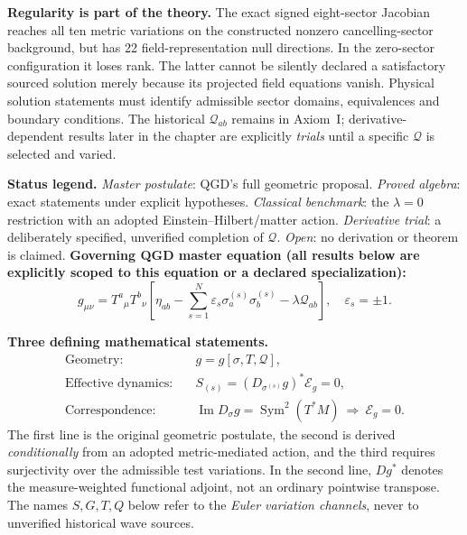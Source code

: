 \documentclass[11pt,a4paper]{article}
\begin{document}
\noindent\textbf{Regularity is part of the theory.} The exact signed eight-sector Jacobian reaches all ten metric variations on the constructed nonzero cancelling-sector background, but has 22 field-representation null directions. In the zero-sector configuration it loses rank. The latter cannot be silently declared a satisfactory sourced solution merely because its projected field equations vanish. Physical solution statements must identify admissible sector domains, equivalences and boundary conditions. The historical $\mathcal Q_{ab}$ remains in Axiom~I; derivative-dependent results later in the chapter are explicitly \emph{trials} until a specific $\mathcal Q$ is selected and varied.

\noindent\textbf{Status legend.} \emph{Master postulate}: QGD's full geometric proposal. \emph{Proved algebra}: exact statements under explicit hypotheses. \emph{Classical benchmark}: the \(\lambda=0\) restriction with an adopted Einstein--Hilbert/matter action. \emph{Derivative trial}: a deliberately specified, unverified completion of \(\mathcal Q\). \emph{Open}: no derivation or theorem is claimed.
\medskip
\noindent\textbf{Governing QGD master equation (all results below are explicitly scoped to this equation or a declared specialization):}
\[
\boxed{g_{\mu\nu}=T^a{}_{\mu}T^b{}_{\nu}
\left[\eta_{ab}-\sum_{s=1}^{N}\varepsilon_s\sigma_a^{(s)}\sigma_b^{(s)}
-\lambda\mathcal Q_{ab}\right],\quad \varepsilon_s=\pm1.}
\]

\medskip
\noindent\textbf{Three defining mathematical statements.}
\begin{equation}\label{eq:qgd062-three-pillars}
\boxed{\begin{aligned}
\text{Geometry:}\quad& g=g[\sigma,T,\mathcal Q],\\
\text{Effective dynamics:}\quad& S_{(s)}=(D_{\sigma^{(s)}}g)^{*}\mathcal E_g=0,\\
\text{Correspondence:}\quad& \operatorname{Im}D_\sigma g=\operatorname{Sym}^2(T^*M)
\ \Longrightarrow\ \mathcal E_g=0.
\end{aligned}}
\end{equation}
The first line is the original geometric postulate, the second is derived
\emph{conditionally} from an adopted metric-mediated action, and the third
requires surjectivity over the admissible test variations. In the second line,
$Dg^{*}$ denotes the measure-weighted functional adjoint, not an
ordinary pointwise transpose. The names $S,G,T,Q$ below refer to the
\emph{Euler variation channels}, never to unverified historical wave sources.
\end{document}
